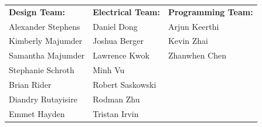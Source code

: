 \documentclass[12pt]{article}
\begin{document}
\begin{titlepage}
\vspace*{0.2in}

\centering
\footnotesize{
 \begin{tabular}{l l l}
  \textbf{Design Team:}&  \textbf{Electrical Team:} & \textbf{Programming Team:} \\
  Alexander Stephens   &  Daniel Dong      &  Arjun Keerthi  \\
  Kimberly Majumder    &  Joshua Berger    &  Kevin Zhai     \\
  Samantha Majumder    &  Lawrence Kwok    &  Zhanwhen Chen  \\
  Stephanie Schroth    &  Minh Vu          &                 \\
  Brian Rider          &  Robert Saskowski &                 \\
  Diandry  Rutayisire  &  Rodman Zhu       &                 \\
  Emmet Hayden         &  Tristan Irvin    &                 \\
 \end{tabular}
}

\vspace*{0.3in}




\end{titlepage}
\end{document}
